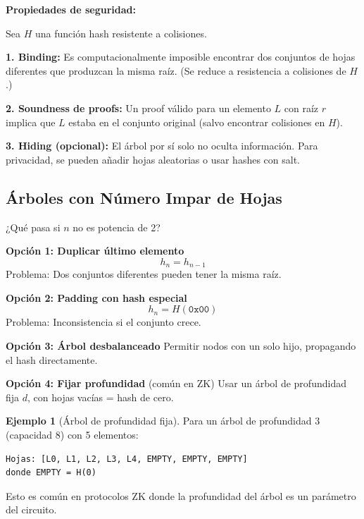 \documentclass[11pt,a4paper,twoside,openright]{book}
\theoremstyle{definition}
\newtheorem{example}{Ejemplo}[chapter]
\theoremstyle{plain}
\theoremstyle{remark}
\begin{document}
\begin{mathnote}
\textbf{Propiedades de seguridad:}

Sea $H$ una función hash resistente a colisiones.

\textbf{1. Binding:} Es computacionalmente imposible encontrar dos conjuntos de hojas diferentes que produzcan la misma raíz. (Se reduce a resistencia a colisiones de $H$.)

\textbf{2. Soundness de proofs:} Un proof válido para un elemento $L$ con raíz $r$ implica que $L$ estaba en el conjunto original (salvo encontrar colisiones en $H$).

\textbf{3. Hiding (opcional):} El árbol por sí solo no oculta información. Para privacidad, se pueden añadir hojas aleatorias o usar hashes con salt.
\end{mathnote}

\subsection{Árboles con Número Impar de Hojas}

\begin{advertencia}
¿Qué pasa si $n$ no es potencia de 2?

\textbf{Opción 1: Duplicar último elemento}
\[ h_{n} = h_{n-1} \]
Problema: Dos conjuntos diferentes pueden tener la misma raíz.

\textbf{Opción 2: Padding con hash especial}
\[ h_{n} = H(\texttt{0x00}) \]
Problema: Inconsistencia si el conjunto crece.

\textbf{Opción 3: Árbol desbalanceado}
Permitir nodos con un solo hijo, propagando el hash directamente.

\textbf{Opción 4: Fijar profundidad} (común en ZK)
Usar un árbol de profundidad fija $d$, con hojas vacías = hash de cero.
\end{advertencia}

\begin{example}[Árbol de profundidad fija]
Para un árbol de profundidad 3 (capacidad 8) con 5 elementos:
\begin{verbatim}
Hojas: [L0, L1, L2, L3, L4, EMPTY, EMPTY, EMPTY]
donde EMPTY = H(0)
\end{verbatim}

Esto es común en protocolos ZK donde la profundidad del árbol es un parámetro del circuito.
\end{example}

\end{document}
